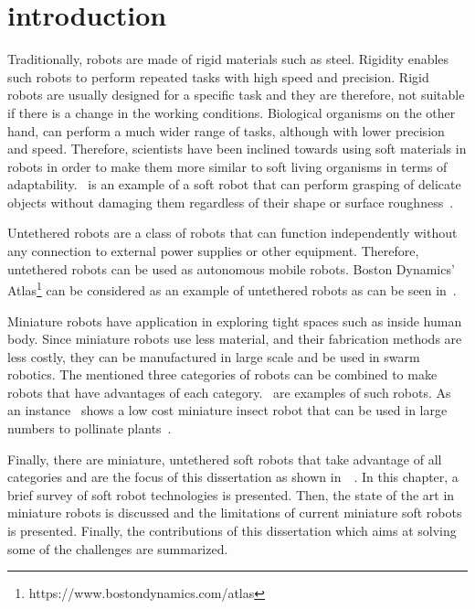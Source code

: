 \graphicspath{{Images/intro/}}
\chapter{introduction}
\label{chap:intro}
Traditionally, robots are made of rigid materials such as steel. Rigidity enables such robots to perform repeated tasks with high speed and precision. Rigid robots are usually designed for a specific task and they are therefore, not suitable if there is a change in the working conditions. Biological organisms on the other hand, can perform a much wider range of tasks, although with lower precision and speed. Therefore, scientists have been inclined towards using soft materials in robots in order to make them more similar to soft living organisms in terms of adaptability.~ is an example of a soft robot that can perform grasping of delicate objects without damaging them regardless of their shape or surface roughness~\cite{Li2019}.

Untethered robots are a class of robots that can function independently without any connection to external power supplies or other equipment. Therefore, untethered robots can be used as autonomous mobile robots. Boston Dynamics' Atlas\footnote{https://www.bostondynamics.com/atlas\label{fn:boston}} can be considered as an example of untethered robots as can be seen in~. 

Miniature robots have application in exploring tight spaces such as inside human body. Since miniature robots use less material, and their fabrication methods are less costly, they can be manufactured in large scale and be used in swarm robotics. The mentioned three categories of robots can be combined to make robots that have advantages of each category.~ are examples of such robots. As an instance~ shows a low cost miniature insect robot that can be used in large numbers to pollinate plants~\cite{Jafferis2019}. 

Finally, there are miniature, untethered soft robots that take advantage of all categories and are the focus of this dissertation as shown in~~\cite{Khodambashi2021untethered}. In this chapter, a brief survey of soft robot technologies is presented. Then, the state of the art in miniature robots is discussed and the limitations of current miniature soft robots is presented. Finally, the contributions of this dissertation which aims at solving some of the challenges are summarized.
 
